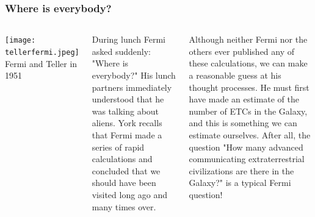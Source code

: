 \begin{frame}
\frametitle{Where is everybody?}

\begin{columns}
\texttt{[image: tellerfermi.jpeg]}
Fermi and Teller in 1951



During lunch Fermi asked suddenly: "Where is everybody?" His lunch partners immediately understood that he was talking about aliens. York recalls that Fermi made a series of rapid calculations and concluded that we should have been visited long ago and many times over.

\vspace{0.5cm}

Although neither Fermi nor the others ever published any of these calculations, we can make a reasonable guess at his thought processes. He must first have made an estimate of the number of ETCs in the Galaxy, and this is something we can estimate ourselves. After all, the question "How many advanced communicating extraterrestrial civilizations are there in the Galaxy?" is a typical Fermi question!
\end{columns}
\end{frame}